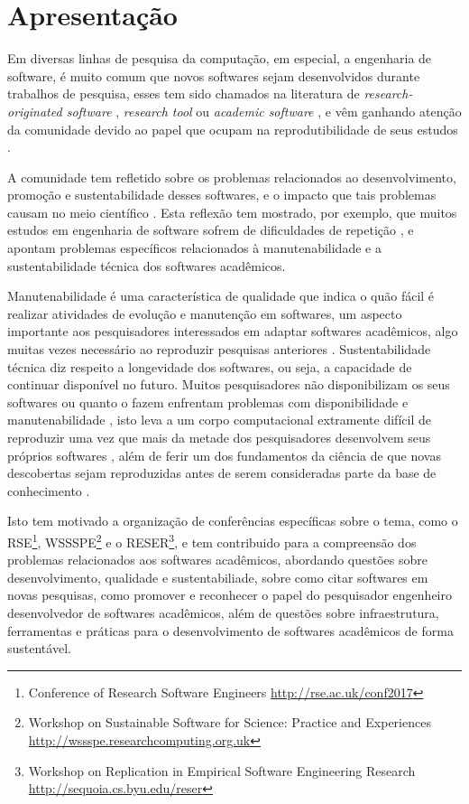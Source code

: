 
\section{Apresentação}

Em diversas linhas de pesquisa da computação, em especial, a engenharia de
software, é muito comum que novos softwares sejam desenvolvidos durante
trabalhos de pesquisa, esses tem sido chamados na literatura de {\it
research-originated software} \cite{Kon2011}, {\it research tool}
\cite{Portillo12} ou {\it academic software} \cite{allen2017engineering}, e vêm
ganhando atenção da comunidade devido ao papel que ocupam na reprodutibilidade
de seus estudos \cite{Peng2011}.

A comunidade tem refletido sobre os problemas relacionados ao
desenvolvimento, promoção e sustentabilidade desses softwares, e o
impacto que tais problemas causam no meio científico \cite{allen2017engineering}. Esta
reflexão tem mostrado, por exemplo, que muitos estudos em engenharia de
software sofrem de dificuldades de repetição \cite{Tang2016}, e apontam
problemas específicos relacionados à manutenabilidade e a sustentabilidade
técnica dos softwares acadêmicos.

Manutenabilidade é uma característica de qualidade que indica o quão fácil é
realizar atividades de evolução e manutenção em softwares, um aspecto
importante aos pesquisadores interessados em adaptar softwares acadêmicos, algo
muitas vezes necessário ao reproduzir pesquisas anteriores \cite{Peng2011}.
Sustentabilidade técnica diz respeito a longevidade dos softwares, ou seja, a
capacidade de continuar disponível no futuro. Muitos pesquisadores não
disponibilizam os seus softwares \cite{robles2010replicating,
amann2015software} ou quanto o fazem enfrentam problemas com disponibilidade e
manutenabilidade \cite{Prlic2012}, isto leva a um corpo computacional
extramente difícil de reproduzir uma vez que mais da metade dos pesquisadores
desenvolvem seus próprios softwares \cite{hettrick_2014_14809}, além de ferir um dos
fundamentos da ciência de que novas descobertas sejam reproduzidas antes de
serem consideradas parte da base de conhecimento \cite{Stodden2009}.

Isto tem motivado a organização de conferências específicas sobre o tema, como
o RSE\footnote{Conference of Research Software Engineers
\url{http://rse.ac.uk/conf2017}}, WSSSPE\footnote{Workshop on Sustainable
Software for Science: Practice and Experiences
\url{http://wssspe.researchcomputing.org.uk}} e o RESER\footnote{Workshop on
Replication in Empirical Software Engineering Research
\url{http://sequoia.cs.byu.edu/reser}}, e tem contribuido para a compreensão
dos problemas relacionados aos softwares acadêmicos, abordando questões sobre
desenvolvimento, qualidade e sustentabiliade, sobre como citar softwares em
novas pesquisas, como promover e reconhecer o papel do pesquisador engenheiro
desenvolvedor de softwares acadêmicos, além de questões sobre infraestrutura,
ferramentas e práticas para o desenvolvimento de softwares acadêmicos de
forma sustentável.

